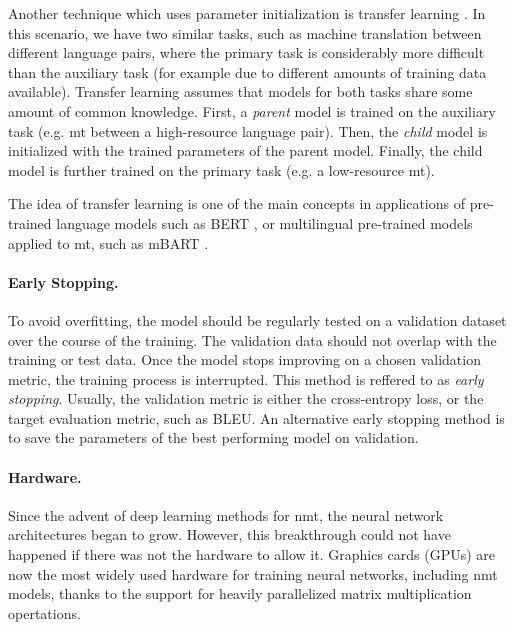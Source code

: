 Another technique which uses parameter initialization is transfer learning
\citep{zoph-etal-2016-transfer}. In this scenario, we have two similar tasks,
such as machine translation between different language pairs, where the primary
task is considerably more difficult than the auxiliary task (for example due to
different amounts of training data available). Transfer learning assumes that
models for both tasks share some amount of common knowledge. First, a
\emph{parent} model is trained on the auxiliary task (e.g. \ac{mt} between a
high-resource language pair). Then, the \emph{child} model is initialized with
the trained parameters of the parent model. Finally, the child model is further
trained on the primary task (e.g. a low-resource \ac{mt}).

The idea of transfer learning is one of the main concepts in applications of
pre-trained language models such as BERT \citep{devlin-etal-2019-bert}, or
multilingual pre-trained models applied to \ac{mt}, such as mBART
\citep{liu-etal-2020-multilingual}.


\paragraph{Early Stopping.} To avoid overfitting, the model should be regularly
tested on a validation dataset over the course of the training. The validation
data should not overlap with the training or test data. Once the model stops
improving on a chosen validation metric, the training process is
interrupted. This method is reffered to as \emph{early stopping}. Usually, the
validation metric is either the cross-entropy loss, or the target evaluation
metric, such as BLEU. An alternative early stopping method is to save the
parameters of the best performing model on validation.

\paragraph{Hardware.} Since the advent of deep learning methods for \ac{nmt},
the neural network architectures began to grow. However, this breakthrough
could not have happened if there was not the hardware to allow it. Graphics
cards (GPUs) are now the most widely used hardware for training neural
networks, including \ac{nmt} models, thanks to the support for heavily
parallelized matrix multiplication opertations.

